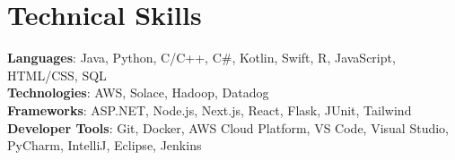 \documentclass[letterpaper,11pt]{article}
\begin{document}
%
 \section{Technical Skills}
 \begin{itemize}[leftmargin=0.15in, label={}]
    \small{\item{
      \textbf{Languages}{: Java, Python, C/C++, C#, Kotlin, Swift, R, JavaScript, HTML/CSS, SQL } \\
      \textbf{Technologies}{: AWS, Solace, Hadoop, Datadog }\\
      \textbf{Frameworks}{: ASP.NET, Node.js, Next.js, React, Flask, JUnit, Tailwind } \\
      \textbf{Developer Tools}{: Git, Docker, AWS Cloud Platform, VS Code, Visual Studio, PyCharm, IntelliJ, Eclipse, Jenkins } 
    }}
 \end{itemize}

\end{document}
